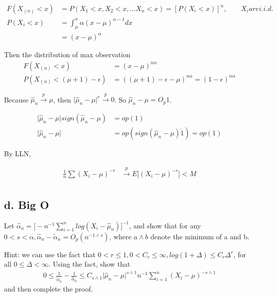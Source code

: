 \documentclass[11pt]{article} %
\begin{document}
\begin{align*}
	F(X_{(n)} < x) & = P(X_1 < x, X_2 < x, ... X_n < x) = [P(X_i < x)]^n, \qquad X_i are i.i.d. \\
	P(X_i < x) &= \int_{\mu}^{x} \alpha (x-\mu)^{\alpha -1} dx \\
	&= (x - \mu)^{\alpha}
\end{align*} 

Then the distribution of max observation
\begin{align*}
	F(X_{(n)} < x) & = (x - \mu)^{n \alpha}\\
	P(X_{(n)} < (\mu + 1)  -\epsilon)&= ((\mu + 1)  -\epsilon - \mu)^{n \alpha} = (1- \epsilon)^{n \alpha}
\end{align*} 


Because $\hat{\mu}_n \xrightarrow {p} \mu$, then $\Big | \hat{\mu}_n- \mu \Big | ^{r} \xrightarrow {p} 0$.
So $\hat{\mu}_n - \mu = O_p{1}$. 

\begin{align*}
	\Big | \hat{\mu}_n- \mu \Big | sign(\hat{\mu}_n - \mu ) & = op(1)\\
	\Big | \hat{\mu}_n- \mu \Big |  & = op(sign(\hat{\mu}_n - \mu ) \dot 1) = op(1)
\end{align*} 
 	
By LLN, 

\begin{align*}
	\frac{1}{n} \sum (X_i - \mu)^{-r} & \xrightarrow {p} E \Big[ (X_i - \mu)^{-r}\Big] < M\\
\end{align*} 

\subsection{d. Big O}
Let $\hat{\alpha}_n = \Big[ -n^{-1} \sum_{i=1}^n log(X_i - \hat{\mu}_n) \Big]^{-1}$, and show that for any $0 < s < \alpha, \hat{\alpha}_n - \tilde{\alpha}_n = O_p(n^{-1 \wedge s})$, where $a \wedge b$ denote the minimum of a and b. 

Hint: we can use the fact that $ 0 < r \leq 1, 0 < C_r \leq \infty, log(1+ \Delta) \leq C_r \Delta^r$, for all $0 \leq \Delta < \infty$. Using the fact, show that
\begin{align*}
	0 \leq \frac{1}{ \tilde{\alpha}_n} - \frac{1}{\hat{\alpha}_n} \leq C_{s \wedge 1} \Big | \hat{\mu}_n - \mu \Big |^{s \wedge 1} n^{-1} \sum_{i=1}^n (X_i - \mu)^{-s \wedge 1} 
\end{align*} 
and then complete the proof.
\end{document}
